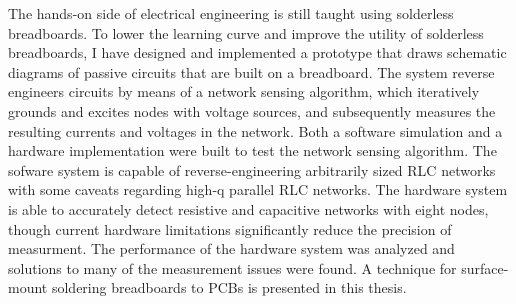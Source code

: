 % 
% 
%







The hands-on side of electrical engineering is still taught using solderless breadboards.  To lower the learning curve and improve the utility of solderless breadboards, I have designed and implemented a prototype that draws schematic diagrams of passive circuits that are built on a breadboard.  The system reverse engineers circuits by means of a network sensing algorithm, which iteratively grounds and excites nodes with voltage sources, and subsequently measures the resulting currents and voltages in the network.  Both a software simulation and a hardware implementation were built to test the network sensing algorithm.  The sofware system is capable of reverse-engineering arbitrarily sized RLC networks with some caveats regarding high-q parallel RLC networks.  The hardware system is able to accurately detect resistive and capacitive networks with eight nodes, though current hardware limitations significantly reduce the precision of measurment.  The performance of the hardware system was analyzed and solutions to many of the measurement issues were found.  A technique for surface-mount soldering breadboards to PCBs is presented in this thesis.

